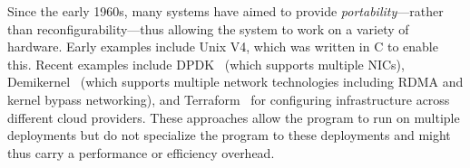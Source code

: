 Since the early 1960s, many systems have aimed to provide \emph{portability}---rather than reconfigurability---thus allowing the system to work on a variety of hardware. Early examples include Unix V4, which was written in C to enable this. Recent examples include DPDK~\cite{dpdk} (which supports multiple NICs), Demikernel~\cite{demikernel} (which supports multiple network technologies including RDMA and kernel bypass networking), and Terraform~\cite{terraform} for configuring infrastructure across different cloud providers. These approaches allow the program to run on multiple deployments but do not specialize the program to these deployments and might thus carry a performance or efficiency overhead.
